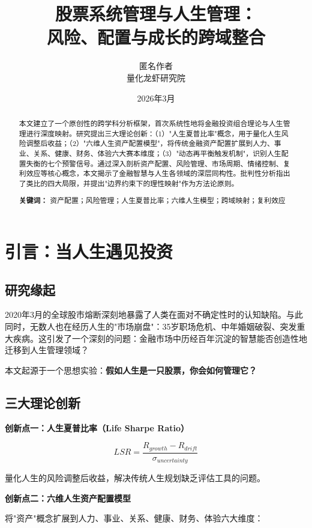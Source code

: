 \documentclass[12pt,a4paper]{article}
\title{\textbf{股票系统管理与人生管理：\\风险、配置与成长的跨域整合}}
\author{匿名作者 \\ \small{量化龙虾研究院}}
\date{2026年3月}
\begin{document}
\maketitle

\begin{abstract}
本文建立了一个原创性的跨学科分析框架，首次系统性地将金融投资组合理论与人生管理进行深度映射。研究提出三大理论创新：（1）"人生夏普比率"概念，用于量化人生风险调整后收益；（2）"六维人生资产配置模型"，将传统金融资产配置扩展到人力、事业、关系、健康、财务、体验六大赛本维度；（3）"动态再平衡触发机制"，识别人生配置失衡的七个预警信号。通过深入剖析资产配置、风险管理、市场周期、情绪控制、复利效应等核心概念，本文揭示了金融智慧与人生各领域的深层同构性。批判性分析指出了类比的四大局限，并提出"边界约束下的理性映射"作为方法论原则。

\textbf{关键词：} 资产配置；风险管理；人生夏普比率；六维人生模型；跨域映射；复利效应
\end{abstract}

\newpage
\tableofcontents
\newpage

\section{引言：当人生遇见投资}

\subsection{研究缘起}

2020年3月的全球股市熔断深刻地暴露了人类在面对不确定性时的认知缺陷。与此同时，无数人也在经历人生的"市场崩盘"：35岁职场危机、中年婚姻破裂、突发重大疾病。这引发了一个深刻的问题：金融市场中历经百年沉淀的智慧能否创造性地迁移到人生管理领域？

本文起源于一个思想实验：\textbf{假如人生是一只股票，你会如何管理它？}

\subsection{三大理论创新}

\textbf{创新点一：人生夏普比率（Life Sharpe Ratio）}

$$LSR = \frac{R_{growth} - R_{drift}}{\sigma_{uncertainty}}$$

量化人生的风险调整后收益，解决传统人生规划缺乏评估工具的问题。

\textbf{创新点二：六维人生资产配置模型}

将"资产"概念扩展到人力、事业、关系、健康、财务、体验六大维度：
\end{document}

